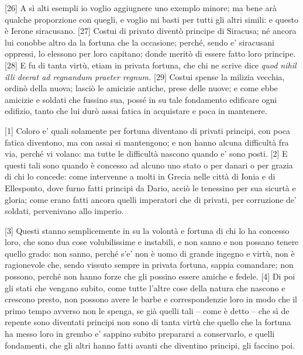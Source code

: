 {[}26{]} A sì alti esempli io voglio aggiugnere uno exemplo minore; ma
bene arà qualche proporzione con quegli, e voglio mi basti per tutti gli
altri simili: e questo è Ierone siracusano. {[}27{]} Costui di privato
diventò principe di Siracusa; né ancora lui conobbe altro da la fortuna
che la occasione; perché, sendo e' siracusani oppressi, lo elessono per
loro capitano; donde meritò di essere fatto loro principe. {[}28{]} E fu
di tanta virtù, etiam in privata fortuna, che chi ne scrive dice
\emph{quod nihil illi deerat ad regnandum praeter regnum.} {[}29{]}
Costui spense la milizia vecchia, ordinò della nuova; lasciò le amicizie
antiche, prese delle nuove; e come ebbe amicizie e soldati che fussino
sua, possé in su tale fondamento edificare ogni edifizio, tanto che lui
durò assai fatica in acquistare e poca in mantenere.


{[}1{]} Coloro e' quali solamente per fortuna diventano di privati
principi, con poca fatica diventono, ma con assai si mantengono; e non
hanno alcuna difficultà fra via, perché vi volano: ma tutte le
difficultà nascono quando e' sono posti. {[}2{]} E questi tali sono
quando è concesso ad alcuno uno stato o per danari o per grazia di chi
lo concede: come intervenne a molti in Grecia nelle città di Ionia e di
Ellesponto, dove furno fatti principi da Dario, acciò le tenessino per
sua sicurtà e gloria; come erano fatti ancora quelli imperatori che di
privati, per corruzione de' soldati, pervenivano allo imperio.

{[}3{]} Questi stanno semplicemente in su la volontà e fortuna di chi lo
ha concesso loro, che sono dua cose volubilissime e instabili, e non
sanno e non possano tenere quello grado: non sanno, perché s'e' non è
uomo di grande ingegno e virtù, non è ragionevole che, sendo vissuto
sempre in privata fortuna, sappia comandare; non possono, perché non
hanno forze che gli possino essere amiche e fedele. {[}4{]} Di poi gli
stati che vengano subito, come tutte l'altre cose della natura che
nascono e crescono presto, non possono avere le barbe e correspondenzie
loro in modo che il primo tempo avverso non le spenga, se già quelli
tali -- come è detto -- che sì de repente sono diventati principi non
sono di tanta virtù che quello che la fortuna ha messo loro in grembo e'
sappino subito prepararsi a conservarlo, e quelli fondamenti, che gli
altri hanno fatti avanti che diventino principi, gli faccino poi.

